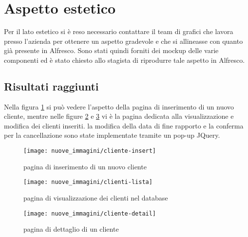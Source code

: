 \section{Aspetto estetico}
Per il lato estetico si è reso necessario contattare il team di grafici che lavora presso l'azienda per ottenere un aspetto gradevole e che si allineasse con quanto già presente in Alfresco. Sono stati quindi forniti dei mockup delle varie componenti ed è stato chiesto allo stagista di riprodurre tale aspetto in Alfresco.
\subsection{Risultati raggiunti}
Nella figura \ref{fig:cliente-insert} si può vedere l'aspetto della pagina di inserimento di un nuovo cliente, mentre nelle figure \ref{fig:clienti-lista} e \ref{fig:cliente-detail} vi è la pagina dedicata alla visualizzazione e modifica dei clienti inseriti. la modifica della data di fine rapporto e la conferma per la cancellazione sono state implementate tramite un pop-up JQuery.
\begin{figure}[!ht]
\centering
\texttt{[image: nuove\_immagini/cliente-insert]}
\caption{pagina di inserimento di un nuovo cliente\label{fig:cliente-insert}}
\end{figure}
\begin{figure}[!ht]
\centering
\texttt{[image: nuove\_immagini/clienti-lista]}
\caption{pagina di visualizzazione dei clienti nel database\label{fig:clienti-lista}}
\end{figure}
\begin{figure}[!ht]
\centering
\texttt{[image: nuove\_immagini/cliente-detail]}
\caption{pagina di dettaglio di un cliente \label{fig:cliente-detail}}
\end{figure}